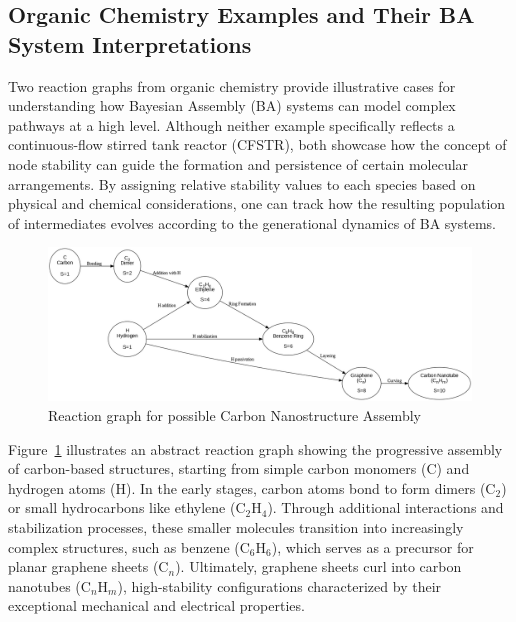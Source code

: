 \documentclass[entropy,article,submit,pdftex,moreauthors]{Definitions/mdpi}
\begin{document}
\subsection{Organic Chemistry Examples and Their BA System Interpretations}
\label{sec:organic-ba-examples}

Two reaction graphs from organic chemistry provide illustrative cases for understanding how Bayesian Assembly (BA) systems can model complex pathways at a high level. Although neither example specifically reflects a continuous-flow stirred tank reactor (CFSTR), both showcase how the concept of node stability can guide the formation and persistence of certain molecular arrangements. By assigning relative stability values to each species based on physical and chemical considerations, one can track how the resulting population of intermediates evolves according to the generational dynamics of BA systems.

\begin{figure}[h]
    \centering
    \includegraphics[width=1\textwidth,height=0.55\textwidth]{abc_nano.png}
    \caption{Reaction graph for possible Carbon Nanostructure Assembly}
    \label{fig:abc_nano}
\end{figure}

Figure~\ref{fig:abc_nano} illustrates an abstract reaction graph showing the progressive assembly of carbon-based structures, starting from simple carbon monomers (\( \text{C} \)) and hydrogen atoms (\( \text{H} \)). In the early stages, carbon atoms bond to form dimers (\( \text{C}_2 \)) or small hydrocarbons like ethylene (\( \text{C}_2\text{H}_4 \)). Through additional interactions and stabilization processes, these smaller molecules transition into increasingly complex structures, such as benzene (\( \text{C}_6\text{H}_6 \)), which serves as a precursor for planar graphene sheets (\( \text{C}_n \)). Ultimately, graphene sheets curl into carbon nanotubes (\( \text{C}_n\text{H}_m \)), high-stability configurations characterized by their exceptional mechanical and electrical properties. 
\end{document}
